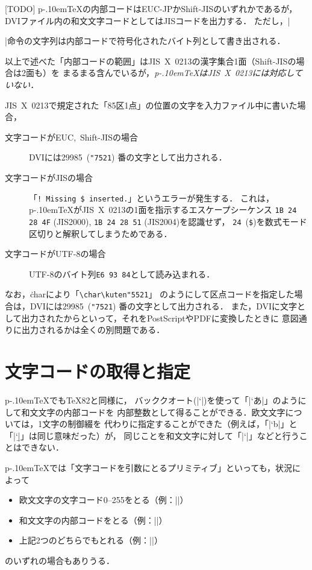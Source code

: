 \documentclass[a4paper,11pt,nomag]{jsarticle}
\def\pTeX{p\kern-.10em\TeX}
\begin{document}
[TODO] \pTeX の内部コードはEUC-JPかShift-JISのいずれかであるが，
DVIファイル内の和文文字コードとしてはJISコードを出力する．
ただし，|\special|命令の文字列は内部コードで符号化されたバイト列として書き出される．

\begin{dangerous}
 以上で述べた「内部コードの範囲」はJIS~X~0213の漢字集合1面（Shift-JISの場合は2面も）を
 まるまる含んでいるが，\emph{\pTeX はJIS~X~0213には対応していない．}

 JIS~X~0213で規定された「85区1点」の位置の文字を入力ファイル中に書いた場合，
 \begin{description}
  \item[文字コードがEUC,~Shift-JISの場合] DVIには29985~(\texttt{"7521})%
    番の文字として出力される．
  \item[文字コードがJISの場合] 「\verb+! Missing $ inserted.+」というエラーが発生する．
    これは，\pTeX がJIS~X~0213の1面を指示するエスケープシーケンス
    \texttt{1B 24 28 4F} (JIS2000), \texttt{1B 24 28 51} (JIS2004)を認識せず，
    \texttt{24}~(\texttt{\$})を数式モード区切りと解釈してしまうためである．
  \item[文字コードがUTF-8の場合] UTF-8のバイト列\texttt{E6 93 84}として読み込まれる．
 \end{description}
 なお，\.{char}により「\verb+\char\kuten"5521+」%
 のようにして区点コードを指定した場合は，DVIには29985~(\texttt{"7521})%
 番の文字として出力される．
 また，DVIに文字として出力されたからといって，それをPostScriptやPDFに変換したときに
 意図通りに出力されるかは全くの別問題である．
\end{dangerous}

\section{文字コードの取得と指定}

\pTeX でも\TeX82と同様に，
バッククオート(|`|)を使って「|`あ|」のようにして和文文字の内部コードを
内部整数として得ることができる．欧文文字については，1文字の制御綴を
代わりに指定することができた（例えば，「|`b|」と「|`\b|」は同じ意味だった）が，
同じことを和文文字に対して「|`\あ|」などと行うことはできない．

\pTeX では「文字コードを引数にとるプリミティブ」といっても，状況によって
\begin{itemize}
 \item 欧文文字の文字コード0--255をとる（例：|\catcode|）
 \item 和文文字の内部コードをとる（例：|\inhibitxspcode|）
 \item 上記2つのどちらでもとれる（例：|\prebreakpenalty|）
\end{itemize}
のいずれの場合もありうる．
\end{document}
